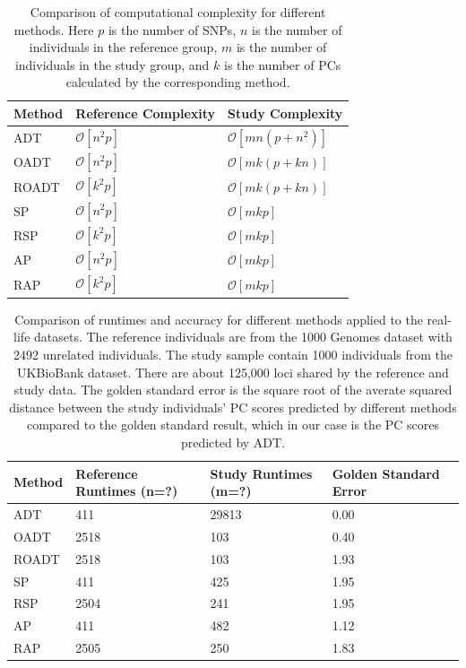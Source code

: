 \documentclass{article}
\newcommand{\bO}{\mathcal{O}}
\begin{document}
\begin{table} 
  \centering
  \begin{tabular}{|l|l|l|}
    \hline
    Method & Reference Complexity & Study Complexity \\ 
    \hline
    ADT & $\bO[n^2 p]$ & $\bO[mn(p + n^2)]$ \\
    \hline
    OADT & $\bO[n^2 p]$ & $\bO[mk(p + k n)]$ \\
    \hline
    ROADT & $\bO[k^2 p]$ & $\bO[mk(p + k n)]$ \\
    \hline
    SP & $\bO[n^2p]$ & $\bO[mkp]$ \\
    \hline
    RSP & $\bO[k^2p]$ & $\bO[mkp]$ \\
    \hline
    AP & $\bO[n^2p]$ &  $\bO[mkp]$ \\
    \hline
    RAP & $\bO[k^2p]$ &  $\bO[mkp]$ \\
    \hline
  \end{tabular}
  \caption{
    Comparison of computational complexity for different methods.
    Here $p$ is the number of SNPs,
    $n$ is the number of individuals in the reference group,
    $m$ is the number of individuals in the  study group,
    and $k$ is the number of PCs calculated by the corresponding method.
  }
  \label{tbl:cplx}
\end{table}

\begin{table} 
  \centering
  \begin{tabular}{|l|l|l|l|l|}
    \hline
    Method & Reference Runtimes (n=?) & Study Runtimes (m=?)& Golden Standard Error \\ 
    \hline
    ADT & 411 & 29813 & 0.00 \\
    \hline
    OADT & 2518 & 103 & 0.40 \\
    \hline
    ROADT & 2518 & 103 & 1.93 \\
    \hline
    SP & 411 & 425 & 1.95 \\
    \hline
    RSP & 2504 & 241 & 1.95 \\
    \hline
    AP & 411 & 482 & 1.12 \\
    \hline
    RAP & 2505 & 250 & 1.83 \\ 
    \hline
  \end{tabular}
  \caption{
    Comparison of runtimes and accuracy for different methods applied to the real-life datasets.
    The reference individuals are from the 1000 Genomes dataset with 2492 unrelated individuals.
    The study sample contain 1000 individuals from the UKBioBank dataset.
    There are about 125,000 loci shared by the reference and study data.
    The golden standard error is the square root of the averate squared distance between the study individuals' PC scores predicted by different methods compared to the golden standard result, which in our case is the PC scores predicted by ADT.
  }
  \label{tbl:ukb}
\end{table} 
\end{document}
